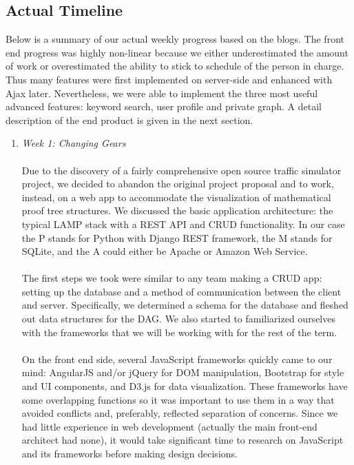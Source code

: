 \documentclass{acm_proc_article-sp}
\begin{document}
\subsection{Actual Timeline}
Below is a summary of our actual weekly progress based on the blogs. The front end progress was highly non-linear because we either underestimated the amount of work or overestimated the ability to stick to schedule of the person in charge. Thus many features were first implemented on server-side and enhanced with Ajax later. Nevertheless, we were able to implement the three most useful advanced features: keyword search, user profile and private graph. A detail description of the end product is given in the next section.
\begin{enumerate}
\item \emph{Week 1: Changing Gears}\\\\
Due to the discovery of a fairly comprehensive open source traffic simulator project, we decided to abandon the original project proposal and to work, instead, on a web app to accommodate the visualization of mathematical proof tree structures. We discussed the basic application architecture: the typical LAMP stack with a REST API and CRUD functionality. In our case the P stands for Python	with Django REST framework, the M stands for SQLite, and the A could either be Apache or Amazon Web Service.\\\\
The first steps we took were similar to any team making a CRUD app: setting up the database and a method of communication between the client and server. Specifically, we determined a schema for the database and fleshed out data structures for the DAG. We also started to familiarized ourselves with the frameworks that we will be working with for the rest of the term.\\\\
On the front end side, several JavaScript frameworks quickly came to our mind:
AngularJS and/or jQuery for DOM manipulation, Bootstrap for style and UI components, and D3.js for data visualization. These frameworks have some overlapping functions so it was important to use them in a way that avoided conflicts and, preferably, reflected separation of concerns. Since we had little experience in web development (actually the main front-end architect had none), it would take significant time to research on JavaScript and its frameworks before making design decisions.\\\\


\end{enumerate}
\end{document}
